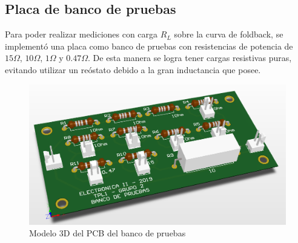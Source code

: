 \subsection{Placa de banco de pruebas}

Para poder realizar mediciones con carga $R_L$ sobre la curva de foldback, se implement\'o una placa como banco de pruebas con resistencias de potencia de $15\Omega$, $10\Omega$, $1\Omega$ y $0.47\Omega$. De esta manera se logra tener cargas resistivas puras, evitando utilizar un re\'ostato debido a la gran inductancia que posee.

\begin{figure}[!ht]
\begin{centering}
\includegraphics[scale=0.45]{Imagenes/Banco3D.png}
\par\end{centering}
\caption{Modelo 3D del PCB del banco de pruebas}

\end{figure}

